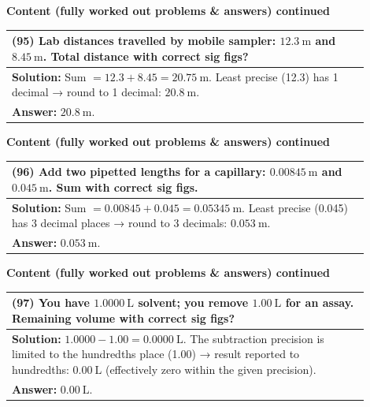 \documentclass{article}
\begin{document}
\noindent
{\large \textbf{Content (fully worked out problems \& answers) continued}} \\[0.2em]
\begin{tabular}{|p{0.9\linewidth}|}
\hline
\vspace{0.2cm}
\textbf{(95)} Lab distances travelled by mobile sampler: $12.3~\text{m}$ and $8.45~\text{m}$. Total distance with correct sig figs? \\
\hline
\vspace{0.2cm}
\textbf{Solution:} Sum $=12.3+8.45=20.75~\text{m}$. Least precise (12.3) has 1 decimal → round to 1 decimal: $20.8~\text{m}$. \\
\textbf{Answer:} $20.8~\text{m}$. \\
\hline
\end{tabular}
\newpage

\noindent
{\large \textbf{Content (fully worked out problems \& answers) continued}} \\[0.2em]
\begin{tabular}{|p{0.9\linewidth}|}
\hline
\vspace{0.2cm}
\textbf{(96)} Add two pipetted lengths for a capillary: $0.00845~\text{m}$ and $0.045~\text{m}$. Sum with correct sig figs. \\
\hline
\vspace{0.2cm}
\textbf{Solution:} Sum $=0.00845+0.045=0.05345~\text{m}$. Least precise (0.045) has 3 decimal places → round to 3 decimals: $0.053~\text{m}$. \\
\textbf{Answer:} $0.053~\text{m}$. \\
\hline
\end{tabular}
\newpage

\noindent
{\large \textbf{Content (fully worked out problems \& answers) continued}} \\[0.2em]
\begin{tabular}{|p{0.9\linewidth}|}
\hline
\vspace{0.2cm}
\textbf{(97)} You have $1.0000~\text{L}$ solvent; you remove $1.00~\text{L}$ for an assay. Remaining volume with correct sig figs? \\
\hline
\vspace{0.2cm}
\textbf{Solution:} $1.0000-1.00=0.0000~\text{L}$. The subtraction precision is limited to the hundredths place (1.00) → result reported to hundredths: $0.00~\text{L}$ (effectively zero within the given precision). \\
\textbf{Answer:} $0.00~\text{L}$. \\
\hline
\end{tabular}
\newpage
\end{document}
